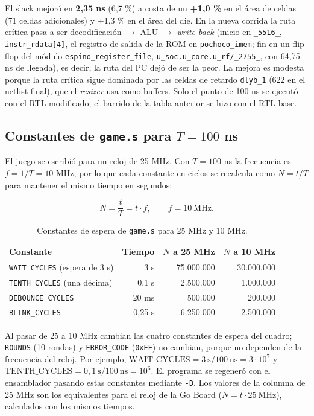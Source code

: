 \documentclass[11pt,letterpaper]{article}
\newcommand{\code}[1]{\texttt{#1}}
\newcommand{\fuente}{\par\vspace{3pt}{\footnotesize\emph{Fuente: Elaboración propia.}}\par}
\begin{document}
El slack mejoró en \textbf{2,35 ns} (6,7 \%) a costa de un \textbf{+1,0 \%} en el área de celdas (71 celdas adicionales) y +1,3 \% en el área del die. En la nueva corrida la ruta crítica pasa a ser decodificación $\rightarrow$ ALU $\rightarrow$ \textit{write-back} (inicio en \code{\_5516\_}, \code{instr\_rdata[4]}, el registro de salida de la ROM en \code{pochoco\_imem}; fin en un flip-flop del módulo \code{espino\_register\_file}, \code{u\_soc.u\_core.u\_rf/\_2755\_}, con 64,75 ns de llegada), es decir, la ruta del PC dejó de ser la peor. La mejora es modesta porque la ruta crítica sigue dominada por las celdas de retardo \code{dlyb\_1} (622 en el netlist final), que el \textit{resizer} usa como buffers. Solo el punto de 100 ns se ejecutó con el RTL modificado; el barrido de la tabla anterior se hizo con el RTL base.

\subsection{Constantes de \texttt{game.s} para $T=100$ ns}

El juego se escribió para un reloj de 25 MHz. Con $T=100$ ns la frecuencia es $f=1/T=10$ MHz, por lo que cada constante en ciclos se recalcula como $N = t/T$ para mantener el mismo tiempo en segundos:

\begin{equation}
N = \frac{t}{T} = t\cdot f, \qquad f=10\ \text{MHz}.
\end{equation}

\begin{table}[H]
\centering
\caption{Constantes de espera de \code{game.s} para 25 MHz y 10 MHz.}
\label{tab:const}
\begin{tabular}{lrrr}
\toprule
\textbf{Constante} & \textbf{Tiempo} & \textbf{$N$ a 25 MHz} & \textbf{$N$ a 10 MHz}\\
\midrule
\code{WAIT\_CYCLES} (espera de 3 s) & 3 s & 75.000.000 & 30.000.000\\
\code{TENTH\_CYCLES} (una décima) & 0,1 s & 2.500.000 & 1.000.000\\
\code{DEBOUNCE\_CYCLES} & 20 ms & 500.000 & 200.000\\
\code{BLINK\_CYCLES} & 0,25 s & 6.250.000 & 2.500.000\\
\bottomrule
\end{tabular}
\fuente
\end{table}

Al pasar de 25 a 10 MHz cambian las cuatro constantes de espera del cuadro; \code{ROUNDS} (10 rondas) y \code{ERROR\_CODE} (\code{0xEE}) no cambian, porque no dependen de la frecuencia del reloj. Por ejemplo, $\mathrm{WAIT\_CYCLES} = 3\ \mathrm{s} / 100\ \mathrm{ns} = 3\cdot 10^{7}$ y $\mathrm{TENTH\_CYCLES} = 0{,}1\ \mathrm{s}/100\ \mathrm{ns} = 10^{6}$. El programa se regeneró con el ensamblador pasando estas constantes mediante \code{-D}. Los valores de la columna de 25 MHz son los equivalentes para el reloj de la Go Board ($N=t\cdot 25\ \text{MHz}$), calculados con los mismos tiempos.
\end{document}
